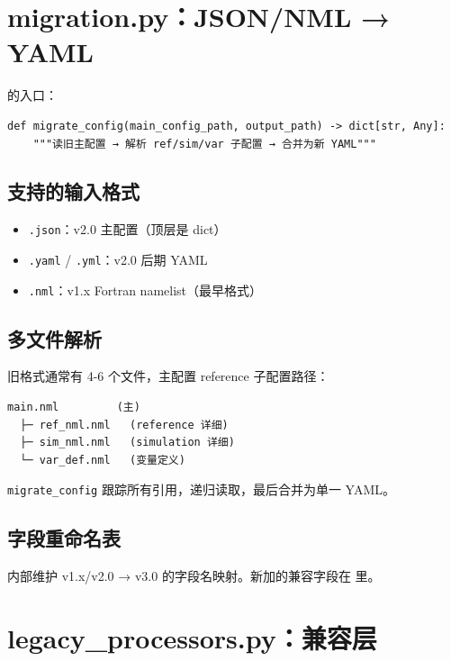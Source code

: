 
\section{migration.py：JSON/NML → YAML}

 的入口：

\begin{verbatim}
def migrate_config(main_config_path, output_path) -> dict[str, Any]:
    """读旧主配置 → 解析 ref/sim/var 子配置 → 合并为新 YAML"""
\end{verbatim}

\subsection{支持的输入格式}

\begin{itemize}
  \item \texttt{.json}：v2.0 主配置（顶层是 dict）
  \item \texttt{.yaml} / \texttt{.yml}：v2.0 后期 YAML
  \item \texttt{.nml}：v1.x Fortran namelist（最早格式）
\end{itemize}

\subsection{多文件解析}

旧格式通常有 4-6 个文件，主配置 reference 子配置路径：

\begin{verbatim}
main.nml         (主)
  ├─ ref_nml.nml   (reference 详细)
  ├─ sim_nml.nml   (simulation 详细)
  └─ var_def.nml   (变量定义)
\end{verbatim}

\texttt{migrate\_config} 跟踪所有引用，递归读取，最后合并为单一 YAML。

\subsection{字段重命名表}

 内部维护 v1.x/v2.0 → v3.0 的字段名映射。新加的兼容字段在  里。

\section{legacy\_processors.py：兼容层}

